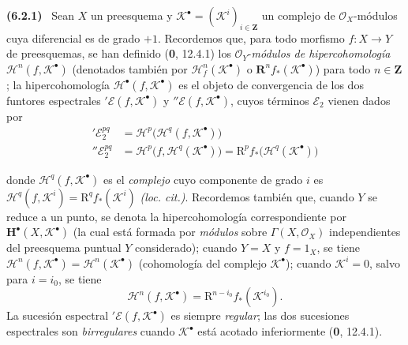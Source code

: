 \documentclass[10pt,oneside]{book}
\newcommand{\oldpage}[2][]{\setcounter{footnote}{0}\marginpar{\scriptsize\textbf{#1}~|~#2}\ignorespaces}
\newenvironment{env}[1][]{\par\medskip\noindent\textbf{(#1)}\ }{\par}
\begin{document}
\begin{env}[6.2.1]
Sean $X$ un preesquema y
$\mathscr K^\bullet=(\mathscr K^i)_{i\in\mathbf Z}$ un complejo de
$\mathscr O_X$-módulos cuya diferencial es de grado $+1$.
Recordemos que, para todo morfismo $f:X\to Y$ de preesquemas, se han definido
(\textbf 0, 12.4.1) los $\mathscr O_Y$-\emph{módulos de hipercohomología}
$\mathscr H^n(f,\mathscr K^\bullet)$ (denotados también por
$\mathscr H_f^n(\mathscr K^\bullet)$ o
$\mathbf R^n f_*(\mathscr K^\bullet)$) para todo $n\in\mathbf Z$;
la hipercohomología $\mathscr H^\bullet(f,\mathscr K^\bullet)$ es el objeto de
convergencia de los dos funtores espectrales
$'\mathscr E(f,\mathscr K^\bullet)$ y
$''\mathscr E(f,\mathscr K^\bullet)$, cuyos términos $\mathscr E_2$ vienen
dados por
\begin{align}
  '\mathscr E_2^{pq}
    &=\mathscr H^p\bigl(\mathscr H^q(f,\mathscr K^\bullet)\bigr)
    \tag{6.2.1.1}\label{III.6.2.1.1}\\
  ''\mathscr E_2^{pq}
    &=\mathscr H^p\bigl(f,\mathscr H^q(\mathscr K^\bullet)\bigr)
      =\mathrm R^p f_*\bigl(\mathscr H^q(\mathscr K^\bullet)\bigr)
    \tag{6.2.1.2}\label{III.6.2.1.2}
\end{align}

\oldpage[III]{139}

donde $\mathscr H^q(f,\mathscr K^\bullet)$ es el \emph{complejo} cuyo componente de
grado $i$ es
$\mathscr H^q(f,\mathscr K^i)=\mathrm R^q f_*(\mathscr K^i)$ \emph{(loc. cit.)}.
Recordemos también que, cuando $Y$ se reduce a un punto, se denota la
hipercohomología correspondiente por $\mathbf H^\bullet(X,\mathscr K^\bullet)$
(la cual está formada por \emph{módulos} sobre $\Gamma(X,\mathscr O_X)$ independientes
del preesquema puntual $Y$ considerado); cuando $Y=X$ y $f=1_X$, se tiene
$\mathscr H^n(f,\mathscr K^\bullet)=\mathscr H^n(\mathscr K^\bullet)$
(cohomología del complejo $\mathscr K^\bullet$); cuando
$\mathscr K^i=0$, salvo para $i=i_0$, se tiene
\[
  \mathscr H^n(f,\mathscr K^\bullet)
    =\mathrm R^{n-i_0}f_*(\mathscr K^{i_0}).
\]
La sucesión espectral $'\mathscr E(f,\mathscr K^\bullet)$ es siempre
\emph{regular}; las dos sucesiones espectrales son \emph{birregulares} cuando
$\mathscr K^\bullet$ está acotado inferiormente (\textbf 0, 12.4.1).


\end{env}
\end{document}
